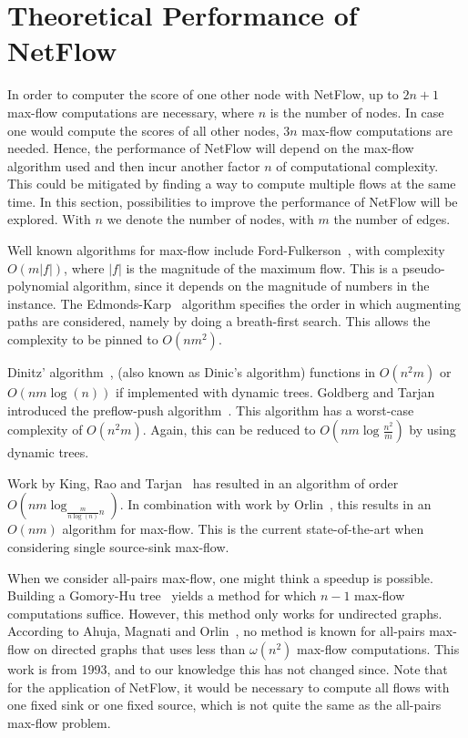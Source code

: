 \documentclass[a4paper,11pt]{book}
\theoremstyle{definition}
\begin{document}
\section{Theoretical Performance of NetFlow}

In order to computer the score of one other node with NetFlow, up to $2n+1$ max-flow
computations are necessary, where $n$ is the number of nodes. In case one would compute
the scores of all other nodes, $3n$ max-flow computations are needed. Hence, the
performance of NetFlow will depend on the max-flow algorithm used and then incur
another factor $n$ of computational complexity. This could be mitigated by finding
a way to compute multiple flows at the same time. In this section, possibilities
to improve the performance of NetFlow will be explored. With $n$ we denote
the number of nodes, with $m$ the number of edges.

Well known algorithms for max-flow include Ford-Fulkerson~\cite{ford1956maximal},
with complexity $O(m|f|)$, where $|f|$ is the magnitude of the maximum flow. This
is a pseudo-polynomial algorithm, since it depends on the magnitude of numbers
in the instance.
The Edmonds-Karp~\cite{edmonds1972theoretical} algorithm specifies the order in which 
augmenting paths are considered, namely by doing a breath-first search. This allows
the complexity to be pinned to $O(nm^2)$.

Dinitz' algorithm~\cite{dinitz2006dinitz}, (also known as Dinic's algorithm) functions
in $O(n^2m)$ or $O(nm\log(n))$ if implemented with dynamic trees. Goldberg and Tarjan
introduced the preflow-push algorithm~\cite{goldberg1988new}. This algorithm
has a worst-case complexity of $O(n^2m)$. Again, this can be reduced to
$O(nm\log\frac{n^2}{m})$ by using dynamic trees.

Work by King, Rao and Tarjan~\cite{king1992faster} has resulted in an algorithm of
order $O(nm\log_{\frac{m}{n\log(n)}n})$. In combination with work by Orlin~\cite{orlin2013max},
this results in an $O(nm)$ algorithm for max-flow. This is the current state-of-the-art
when considering single source-sink max-flow.

When we consider all-pairs max-flow, one might think a speedup is possible. 
Building a Gomory-Hu tree~\cite{gomory1961multi} yields a method
for which $n-1$ max-flow computations suffice. However, this method only works for undirected graphs.
According to Ahuja, Magnati and Orlin~\cite{ahuja1993network}, no method is known for all-pairs max-flow
on directed graphs that uses less than $\omega(n^2)$ max-flow computations. This work is from
1993, and to our knowledge this has not changed since. Note that for the application of
NetFlow, it would be necessary to compute all flows with one fixed sink or one fixed source,
which is not quite the same as the all-pairs max-flow problem.
\end{document}
